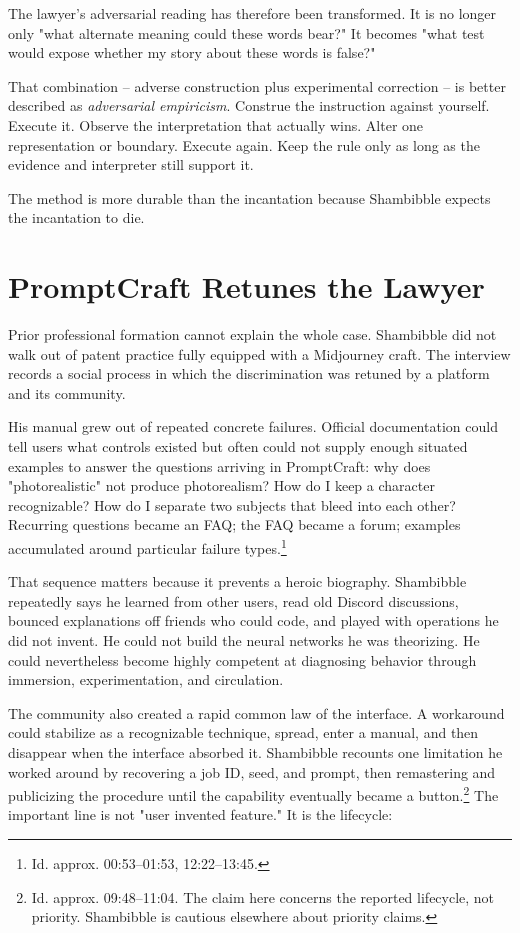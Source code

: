 \documentclass[11pt]{article}
\begin{document}
The lawyer's adversarial reading has therefore been transformed. It is no longer only "what alternate meaning could these words bear?" It becomes "what test would expose whether my story about these words is false?"

That combination -- adverse construction plus experimental correction -- is better described as \textit{adversarial empiricism}. Construe the instruction against yourself. Execute it. Observe the interpretation that actually wins. Alter one representation or boundary. Execute again. Keep the rule only as long as the evidence and interpreter still support it.

The method is more durable than the incantation because Shambibble expects the incantation to die.

\section{PromptCraft Retunes the Lawyer}

Prior professional formation cannot explain the whole case. Shambibble did not walk out of patent practice fully equipped with a Midjourney craft. The interview records a social process in which the discrimination was retuned by a platform and its community.

His manual grew out of repeated concrete failures. Official documentation could tell users what controls existed but often could not supply enough situated examples to answer the questions arriving in PromptCraft: why does "photorealistic" not produce photorealism? How do I keep a character recognizable? How do I separate two subjects that bleed into each other? Recurring questions became an FAQ; the FAQ became a forum; examples accumulated around particular failure types.\footnote{Id. approx. 00:53--01:53, 12:22--13:45.}

That sequence matters because it prevents a heroic biography. Shambibble repeatedly says he learned from other users, read old Discord discussions, bounced explanations off friends who could code, and played with operations he did not invent. He could not build the neural networks he was theorizing. He could nevertheless become highly competent at diagnosing behavior through immersion, experimentation, and circulation.

The community also created a rapid common law of the interface. A workaround could stabilize as a recognizable technique, spread, enter a manual, and then disappear when the interface absorbed it. Shambibble recounts one limitation he worked around by recovering a job ID, seed, and prompt, then remastering and publicizing the procedure until the capability eventually became a button.\footnote{Id. approx. 09:48--11:04. The claim here concerns the reported lifecycle, not priority. Shambibble is cautious elsewhere about priority claims.} The important line is not "user invented feature." It is the lifecycle:
\end{document}
